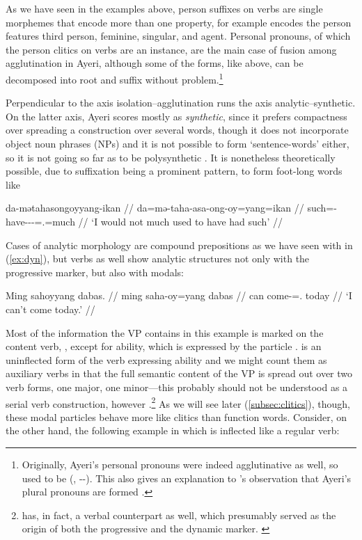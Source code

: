 As we have seen in the examples above, person suffixes on verbs are single 
morphemes that encode more than one property, for example  
encodes the person features third person, feminine, singular, and agent. 
Personal pronouns, of which the person clitics on 
verbs are an instance, are the main case of fusion among agglutination in 
Ayeri, although some of the forms, like  above, can 
be decomposed into root and suffix without problem.\footnote{Originally, 
Ayeri's personal pronouns were indeed agglutinative as well, so 
 used to be  (, 
\Tsg{}-\F{}-\Aarg{}). This also gives an explanation to \citet{boga2016}'s 
observation that Ayeri's plural pronouns are formed .}

Perpendicular to the axis isolation–agglutination runs the axis 
analytic–syn\-thetic. On the latter axis, Ayeri scores mostly as 
\emph{synthetic}, since it prefers compactness over spreading a construction 
over several words, though it does not incorporate object noun phrases (NPs) 
and it is not possible to form `sentence-words' either, so it is not going so 
far as to be poly\-syn\-thetic \citep[45--46]{comrie1989}. It is nonetheless 
theoretically possible, due to suffixation being a prominent pattern, to form 
foot-long words like

\ex\label{ex:footlong}\begingl
	\gla da-mətahasongoyyang-ikan //
	\glb da=mə-taha-asa-ong-oy=yang=ikan //
	\glc such=\Pst{}-have-\Hab{}-\Irr{}-\Neg{}=\Fsg{}.\Aarg{}=much //
	\glft `I would not much used to have had such' //
\endgl\xe

Cases of analytic morphology are compound prepositions as we have seen 
with  in (\ref{ex:dyn}), but verbs as well 
show analytic structures not only with the progressive marker, but also with 
modals:

\ex\begingl
	\gla Ming sahoyyang dabas. //
	\glb ming saha-oy=yang dabas //
	\glc can come-\Neg{}=\Fsg{}.\Aarg{} today //
	\glft `I can't come today.' //
\endgl\xe

Most of the information the VP contains in this example is marked on the
content verb, , except for ability, which is expressed
by the particle .  is an uninflected
form of the verb expressing ability and we might count them as auxiliary verbs
in that the full semantic content of the VP is spread out over two verb forms,
one major, one minor---this probably should not be understood as a serial verb
construction, however \citep{aikhenvald2006}.\footnote{ has, in
fact, a verbal counterpart  as well, which
presumably served as the origin of both the progressive and the dynamic marker.
\label{fn:mangaverb}} As we will see later (\autoref{subsec:clitics}), though,
these modal particles behave more like clitics than function words. Consider,
on the other hand, the following example in which  is
inflected like a regular verb:

